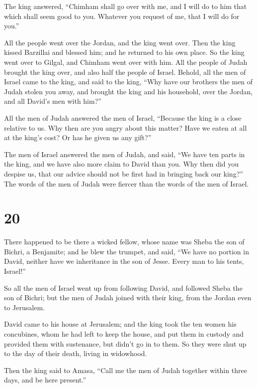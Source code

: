  The king answered, ``Chimham shall go over with me, and I
will do to him that which shall seem good to you. Whatever you request
of me, that I will do for you.''

 All the people went over the Jordan, and the king went
over. Then the king kissed Barzillai and blessed him; and he returned to
his own place.  So the king went over to Gilgal, and
Chimham went over with him. All the people of Judah brought the king
over, and also half the people of Israel.  Behold, all the
men of Israel came to the king, and said to the king, ``Why have our
brothers the men of Judah stolen you away, and brought the king and his
household, over the Jordan, and all David's men with him?''

 All the men of Judah answered the men of Israel, ``Because
the king is a close relative to us. Why then are you angry about this
matter? Have we eaten at all at the king's cost? Or has he given us any
gift?''

 The men of Israel answered the men of Judah, and said,
``We have ten parts in the king, and we have also more claim to David
than you. Why then did you despise us, that our advice should not be
first had in bringing back our king?'' The words of the men of Judah
were fiercer than the words of the men of Israel.

\hypertarget{section-19}{%
\section{20}\label{section-19}}

 There happened to be there a wicked fellow, whose name was
Sheba the son of Bichri, a Benjamite; and he blew the trumpet, and said,
``We have no portion in David, neither have we inheritance in the son of
Jesse. Every man to his tents, Israel!''

 So all the men of Israel went up from following David, and
followed Sheba the son of Bichri; but the men of Judah joined with their
king, from the Jordan even to Jerusalem.

 David came to his house at Jerusalem; and the king took the
ten women his concubines, whom he had left to keep the house, and put
them in custody and provided them with sustenance, but didn't go in to
them. So they were shut up to the day of their death, living in
widowhood.

 Then the king said to Amasa, ``Call me the men of Judah
together within three days, and be here present.''

